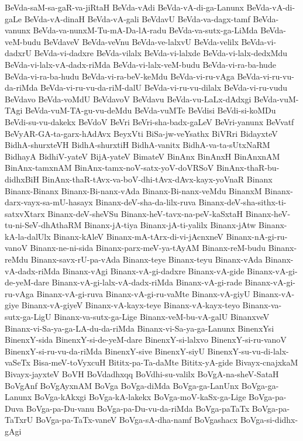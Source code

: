 {BeVda-saM-sa-gaR-va-jiRtaH
BeVda-vAdi
BeVda-vA-di-ga-Lanunx
BeVda-vA-di-gaLe
BeVda-vA-dinaH
BeVda-vA-gali
BeVdavU
BeVda-va-dagx-tamf
BeVda-vanunx
BeVda-va-nunxM-Tu-mA-Da-lA-radu
BeVda-va-sutx-ga-LiMda
BeVda-veM-budu
BeVdaveV
BeVda-veVnu
BeVda-ve-lalxvU
BeVda-velilx
BeVda-vi-dadxrU
BeVda-vi-dadxre
BeVda-vilalx
BeVda-vi-lalxde
BeVda-vi-lalx-dedxMdu
BeVda-vi-lalx-vA-dadx-riMda
BeVda-vi-lalx-veM-budu
BeVda-vi-ra-ba-hude
BeVda-vi-ra-ba-hudu
BeVda-vi-ra-beV-keMdu
BeVda-vi-ru-vAga
BeVda-vi-ru-vu-da-riMda
BeVda-vi-ru-vu-da-riM-dalU
BeVda-vi-ru-vu-dilalx
BeVda-vi-ru-vudu
BeVdavo
BeVda-voMdU
BeVdavoV
BeVdavu
BeVda-vu-LaLx-dAdxgi
BeVda-vuM-TAgi
BeVda-vuM-TA-gu-vu-deMdu
BeVda-vuMTe
BeVdisi
BeVdi-si-koMDu
BeVdi-su-vu-dakekx
BeVdoV
BeVri
BeVri-sha-badx-gaLeV
BeVri-yanunx
BeVvatf
BeVyAR-GA-ta-garx-hAdAvx
BeyxVti
BiSa-jw-veYsathx
BiVRri
BidayxteV
BidhA-shurxteVH
BidhA-shurxtiH
BidhA-vanitx
BidhA-va-ta-sUtxNaRM
BidhayA
BidhiV-yateV
BijA-yateV
BimateV
BinAnx
BinAnxH
BinAnxnAM
BinAnx-tamxnAM
BinAnx-tamx-noV-satx-yoV-doVRSoV
BinAnx-thaR-bu-didhxBiH
BinAnx-thaR-tAvx-va-boV-dhi-tAvx-dAvx-kayx-yoVnaR
Binanx
Binanx-Binanx
Binanx-Bi-nanx-vAda
Binanx-Bi-nanx-veMdu
BinanxM
Binanx-darx-vayx-sa-mU-hasayx
Binanx-deV-sha-da-lilx-ruva
Binanx-deV-sha-sithx-ti-satxvXtarx
Binanx-deV-sheVSu
Binanx-heV-tavx-na-peV-kaSxtaH
Binanx-heV-tu-ni-SeV-dhAthaRM
Binanx-jA-tiya
Binanx-jA-ti-yalilx
Binanx-jAtw
Binanx-kA-la-dalUlx
Binanx-kAleV
Binanx-mA-tArx-di-vi-jAcnxneV
Binanx-nA-gi-ru-vanoV
Binanx-ne-ni-sida
Binanx-parx-meV-ya-tAyAM
Binanx-reM-budu
Binanx-reMdu
Binanx-savx-rU-pa-vAda
Binanx-teye
Binanx-teyu
Binanx-vAda
Binanx-vA-dadx-riMda
Binanx-vAgi
Binanx-vA-gi-dadxre
Binanx-vA-gide
Binanx-vA-gi-de-yeM-dare
Binanx-vA-gi-lalx-vA-dadx-riMda
Binanx-vA-gi-rade
Binanx-vA-gi-ru-vAga
Binanx-vA-gi-ruva
Binanx-vA-gi-ru-vaMte
Binanx-vA-giyU
Binanx-vA-giye
Binanx-vA-giyeV
Binanx-vA-kayx-teye
Binanx-vA-kayx-teyo
Binanx-va-sutx-ga-LigU
Binanx-va-sutx-ga-Lige
Binanx-veM-bu-vA-galU
BinanxveV
Binanx-vi-Sa-ya-ga-LA-du-da-riMda
Binanx-vi-Sa-ya-ga-Lanunx
BinenxYsi
BinenxY-sida
BinenxY-si-de-yeM-dare
BinenxY-si-lalxvo
BinenxY-si-ru-vanoV
BinenxY-si-ru-vu-da-riMda
BinenxY-sive
BinenxY-siyU
BinenxY-su-vu-di-lalx-vaSeTx
Bisa-meV-toVyxcuH
Bititx-pa-Ta-daMte
Bititx-yA-gide
Bivayx-cnajxkaM
Bivayx-jayxteV
BoVH
BoVdadhxqq
BoVdhi-su-valilx
BoVgA-na-sheV-SataH
BoVgAnf
BoVgAyxnAM
BoVga
BoVga-diMda
BoVga-ga-LanUnx
BoVga-ga-Lanunx
BoVga-kAkxgi
BoVga-kA-lakekx
BoVga-moV-kaSx-ga-Lige
BoVga-pa-Duva
BoVga-pa-Du-vanu
BoVga-pa-Du-vu-da-riMda
BoVga-paTaTx
BoVga-pa-TaTxrU
BoVga-pa-TaTx-vaneV
BoVga-sA-dha-namf
BoVgashacx
BoVga-si-didhx-gAgi
}
